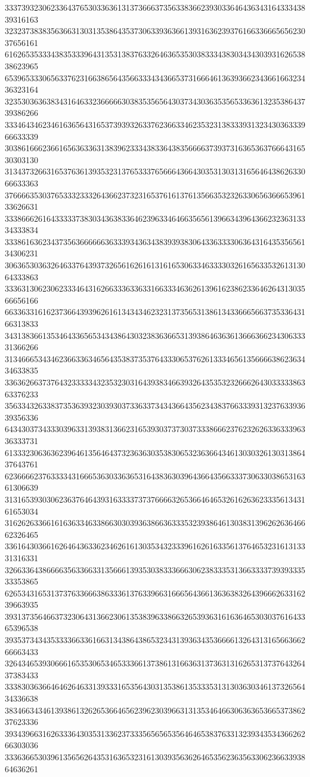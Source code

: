 33373932306233643765303363613137366637356338366239303364643634316433343839316163
32323738383563663130313538643537306339363661393163623937616633666565623037656161
61626535333438353339643135313837633264636535303833343830343430393162653838623965
65396533306563376231663865643566333434366537316664613639366234366166323436323164
32353036363834316463323666663038353565643037343036353565336361323538643739386266
33346434623461636564316537393932633762366334623532313833393132343036333966633339
30386166623661656363363138396233343833643835666637393731636536376664316530303130
31343732663165376361393532313765333765666436643035313031316564643862633066633363
37666635303765333233326436623732316537616137613566353232633065636665396133626631
33386662616433333738303436383364623963346466356561396634396436623236313334333834
33386163623437356366666636333934363438393938306433633330636431643535656134306231
30636530363264633764393732656162616131616530633463333032616563353261313064333863
33363130623062333464316266333633633166333463626139616238623364626431303566656166
66336331616237366439396261613434346232313735653138613433666566373533643166313833
34313836613534643365653434386430323836366531393864636361366636623430633331366266
31346665343462366336346564353837353764333065376261333465613566663862363434633835
33636266373764323333343235323031643938346639326435353232666264303333386363376233
35633432633837353639323039303733633734343664356234383766333931323763393639356336
64343037343330396331393831366231653930373730373338666237623262633633396336333731
61333230636362396461356464373236363035383065323636643461303032613031386437643761
62366662376333343166653630336365316438363039643664356633373063303865316361306639
31316539303062363764643931633337373766663265366464653261626362333561343161653034
31626263366161636334633866303039363866363335323938646130383139626263646662326465
33616430366162646436336234626161303534323339616261633561376465323161313331316331
32663364386666356336633135666139353038333666306238333531366333373939333533353865
62653431653137376336663863336137633966316665643661363638326439666263316239663935
39313735646637323064313662306135383963386632653936316163646530303761643365396538
39353734343533336633616631343864386532343139363435366661326431316566366266663433
32643465393066616535306534653336613738613166363137363131626531373764326437383433
33383036366464626463313933316535643031353861353335313130363034613732656434336638
38346634346139386132626536646562396230396631313534646630636365366537386237623336
39343966316263336430353133623733356565653564646538376331323934353436626266303036
33363665303961356562643531636532316130393563626465356236356330623663393864636261
